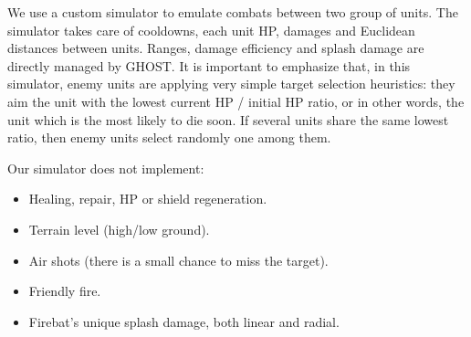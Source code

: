\documentclass[journal]{IEEEtran}
\newcommand{\minormod}[1]{\color{red} #1\color{black} \xspace}
\newcommand{\ghost}{\textsc{GHOST}\xspace}
\begin{document}
We use a custom simulator to emulate  combats between two group of units. The simulator takes care of
cooldowns,  each  unit HP,  damages and
 Euclidean  distances between units. Ranges,  damage efficiency
and splash damage are directly managed by \ghost.  It is important to
emphasize that, in this simulator, \minormod{enemy units are applying very simple target selection heuristics: they aim the unit with the lowest current HP / initial HP ratio, or in other words, the unit which is the most likely to die soon. If several units share the same lowest ratio, then enemy units select randomly one among them.}

Our simulator does not implement:
\begin{itemize}
\item Healing, repair, HP or shield regeneration.
\item Terrain level (high/low ground).
\item Air shots (there is a small chance to miss the target).
\item Friendly fire.
\item Firebat's unique splash damage, both linear and radial.
\end{itemize}
\end{document}
